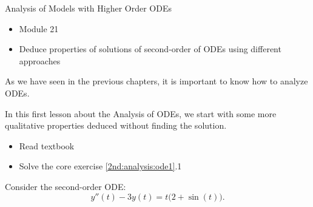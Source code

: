 \begin{module}{Analysis of Models with Higher Order ODEs}
	\label{2nd:analysis}

	
	
\end{module}



\begin{lesson}

	\begin{itemize}
		\item Module 21
	\end{itemize}

	\begin{itemize}
		\item Deduce properties of solutions of second-order of ODEs using different approaches
	\end{itemize}
	

As we have seen in the previous chapters, it is important to know how to analyze ODEs.

In this first lesson about the Analysis of ODEs, we start with some more qualitative properties deduced without finding the solution.

\begin{itemize}
	\item Read textbook
	\item Solve the core exercise \ref{2nd:analysis:ode1}.1
\end{itemize}

\end{lesson}





\question \label{2nd:analysis:ode1}
	Consider the second-order ODE:
	$$
	y''(t) - 3y(t) = t \big( 2 + \sin(t) \big).
	$$
	
